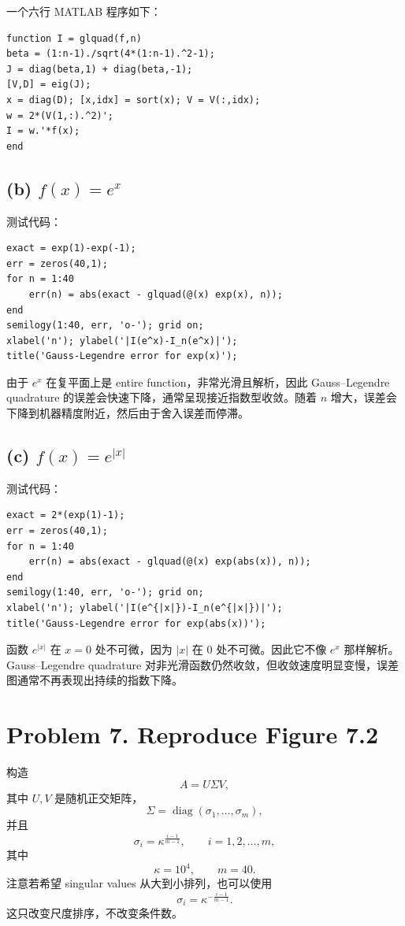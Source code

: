 \documentclass[11pt]{ctexart}
\begin{document}
一个六行 MATLAB 程序如下：

\begin{lstlisting}
function I = glquad(f,n)
beta = (1:n-1)./sqrt(4*(1:n-1).^2-1);
J = diag(beta,1) + diag(beta,-1);
[V,D] = eig(J);
x = diag(D); [x,idx] = sort(x); V = V(:,idx);
w = 2*(V(1,:).^2)';
I = w.'*f(x);
end
\end{lstlisting}

\subsection*{(b) $f(x)=e^x$}

测试代码：

\begin{lstlisting}
exact = exp(1)-exp(-1);
err = zeros(40,1);
for n = 1:40
    err(n) = abs(exact - glquad(@(x) exp(x), n));
end
semilogy(1:40, err, 'o-'); grid on;
xlabel('n'); ylabel('|I(e^x)-I_n(e^x)|');
title('Gauss-Legendre error for exp(x)');
\end{lstlisting}

由于 $e^x$ 在复平面上是 entire function，非常光滑且解析，因此 Gauss--Legendre quadrature 的误差会快速下降，通常呈现接近指数型收敛。随着 $n$ 增大，误差会下降到机器精度附近，然后由于舍入误差而停滞。

\subsection*{(c) $f(x)=e^{|x|}$}

测试代码：

\begin{lstlisting}
exact = 2*(exp(1)-1);
err = zeros(40,1);
for n = 1:40
    err(n) = abs(exact - glquad(@(x) exp(abs(x)), n));
end
semilogy(1:40, err, 'o-'); grid on;
xlabel('n'); ylabel('|I(e^{|x|})-I_n(e^{|x|})|');
title('Gauss-Legendre error for exp(abs(x))');
\end{lstlisting}

函数 $e^{|x|}$ 在 $x=0$ 处不可微，因为 $|x|$ 在 $0$ 处不可微。因此它不像 $e^x$ 那样解析。Gauss--Legendre quadrature 对非光滑函数仍然收敛，但收敛速度明显变慢，误差图通常不再表现出持续的指数下降。

\section*{Problem 7. Reproduce Figure 7.2}

构造
\[
A=U\Sigma V,
\]
其中 $U,V$ 是随机正交矩阵，
\[
\Sigma=\operatorname{diag}(\sigma_1,\ldots,\sigma_m),
\]
并且
\[
\sigma_i=\kappa^{\frac{i-1}{m-1}},
\qquad i=1,2,\ldots,m,
\]
其中
\[
\kappa=10^4,
\qquad m=40.
\]
注意若希望 singular values 从大到小排列，也可以使用
\[
\sigma_i=\kappa^{-\frac{i-1}{m-1}}.
\]
这只改变尺度排序，不改变条件数。
\end{document}
